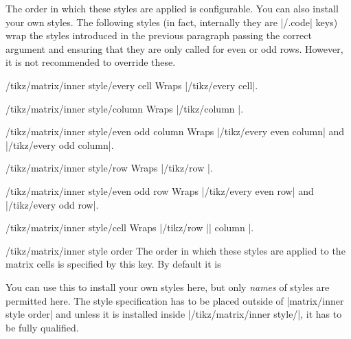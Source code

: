 The order in which these styles are applied is configurable.  You can also
install your own styles.  The following styles (in fact, internally they are
|/.code| keys) wrap the styles introduced in the previous paragraph passing the
correct argument and ensuring that they are only called for even or odd rows.
However, it is not recommended to override these.

\begin{stylekey}{/tikz/matrix/inner style/every cell}
    Wraps |/tikz/every cell|.
\end{stylekey}
\begin{stylekey}{/tikz/matrix/inner style/column}
    Wraps |/tikz/column |.
\end{stylekey}
\begin{stylekey}{/tikz/matrix/inner style/even odd column}
    Wraps |/tikz/every even column| and |/tikz/every odd column|.
\end{stylekey}
\begin{stylekey}{/tikz/matrix/inner style/row}
    Wraps |/tikz/row |.
\end{stylekey}
\begin{stylekey}{/tikz/matrix/inner style/even odd row}
    Wraps |/tikz/every even row| and |/tikz/every odd row|.
\end{stylekey}
\begin{stylekey}{/tikz/matrix/inner style/cell}
    Wraps |/tikz/row || column |.
\end{stylekey}

\begin{stylekey}{/tikz/matrix/inner style order}
    The order in which these styles are applied to the matrix cells is
    specified by this key.  By default it is
\begin{codeexample}
\end{codeexample}
    You can use this to install your own styles here, but only \emph{names} of
    styles are permitted here.  The style specification has to be placed
    outside of |matrix/inner style order| and unless it is installed inside
    |/tikz/matrix/inner style/|, it has to be fully qualified.
\begin{codeexample}
\end{codeexample}
\end{stylekey}

